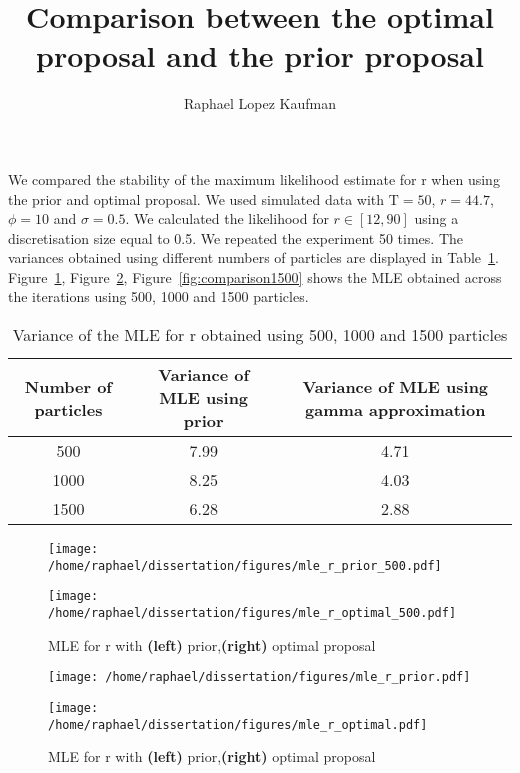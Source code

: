 \documentclass{article}
\title{Comparison between the optimal proposal and the prior proposal}
\author{Raphael Lopez Kaufman}
\date{}
\begin{document}
We compared the stability of the maximum likelihood estimate for r when using the prior and optimal proposal. We used simulated data with $\mathrm{T}=50$, $r=44.7$, $\phi=10$ and $\sigma=0.5$. We calculated the likelihood for $r \in [12, 90]$ using a discretisation size equal to 0.5. We repeated the experiment 50 times. The variances obtained using different numbers of particles are displayed in Table~\ref{table:mle}. Figure~\ref{fig:comparison500}, Figure~\ref{fig:comparison1000}, Figure~\ref{fig:comparison1500} shows the MLE obtained across the iterations using 500, 1000 and 1500 particles.

	\begin{table}[htb]
		\centering
		\vspace{5mm}
		\begin{tabular}{c|c|c}
			Number of particles & Variance of MLE using prior &  Variance of MLE using gamma approximation \\ \hline
			500 & 7.99 & 4.71\\ \hline
			1000 & 8.25 & 4.03 \\ \hline
			1500 & 6.28 &  2.88 \\ \hline
		\end{tabular}
		\caption{Variance of the MLE for r obtained using 500, 1000 and 1500 particles}
		\label{table:mle}
		\vspace{5mm}
	\end{table}
	
	\begin{figure}[htb]
		\centering
		\begin{minipage}{0.9\textwidth}
			\centering
			\texttt{[image: /home/raphael/dissertation/figures/mle\_r\_prior\_500.pdf]}
		\end{minipage}
		\begin{minipage}{.9\textwidth}
			\centering
			\texttt{[image: /home/raphael/dissertation/figures/mle\_r\_optimal\_500.pdf]}
		\end{minipage}
		\caption{MLE for r with \textbf{(left)} prior,\textbf{(right)} optimal proposal}
		\label{fig:comparison500}
	\end{figure}

\begin{figure}[htb]
	\centering
	\begin{minipage}{0.9\textwidth}
		\centering
		\texttt{[image: /home/raphael/dissertation/figures/mle\_r\_prior.pdf]}
	\end{minipage}
	\begin{minipage}{.9\textwidth}
		\centering
		\texttt{[image: /home/raphael/dissertation/figures/mle\_r\_optimal.pdf]}
	\end{minipage}
	\caption{MLE for r with \textbf{(left)} prior,\textbf{(right)} optimal proposal}
	\label{fig:comparison1000}
\end{figure}
\end{document}
